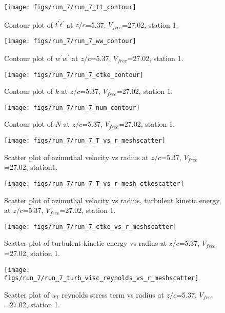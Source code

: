 \begin{figure}[H]
\centering
\texttt{[image: figs/run\_7/run\_7\_tt\_contour]}
\caption{Contour plot of $\overline{t^\prime t^\prime}$ at $z/c$=5.37, $V_{free}$=27.02, station 1.}
\end{figure}


\begin{figure}[H]
\centering
\texttt{[image: figs/run\_7/run\_7\_ww\_contour]}
\caption{Contour plot of $\overline{w^\prime w^\prime}$ at $z/c$=5.37, $V_{free}$=27.02, station 1.}
\end{figure}


\begin{figure}[H]
\centering
\texttt{[image: figs/run\_7/run\_7\_ctke\_contour]}
\caption{Contour plot of $k$ at $z/c$=5.37, $V_{free}$=27.02, station 1.}
\end{figure}


\begin{figure}[H]
\centering
\texttt{[image: figs/run\_7/run\_7\_num\_contour]}
\caption{Contour plot of $N$ at $z/c$=5.37, $V_{free}$=27.02, station 1.}
\end{figure}


\begin{figure}[H]
\centering
\texttt{[image: figs/run\_7/run\_7\_T\_vs\_r\_meshscatter]}
\caption{Scatter plot of azimuthal velocity vs radius at $z/c$=5.37, $V_{free}$=27.02, station1.}
\end{figure}


\begin{figure}[H]
\centering
\texttt{[image: figs/run\_7/run\_7\_T\_vs\_r\_mesh\_ctkescatter]}
\caption{Scatter plot of azimuthal velocity vs radius, turbulent kinetic energy, at $z/c$=5.37, $V_{free}$=27.02, station 1.}
\end{figure}


\begin{figure}[H]
\centering
\texttt{[image: figs/run\_7/run\_7\_ctke\_vs\_r\_meshscatter]}
\caption{Scatter plot of turbulent kinetic energy vs radius at $z/c$=5.37, $V_{free}$=27.02, station 1.}
\end{figure}


\begin{figure}[H]
\centering
\texttt{[image: figs/run\_7/run\_7\_turb\_visc\_reynolds\_vs\_r\_meshscatter]}
\caption{Scatter plot of $
u_T$ reynolds stress term vs radius at $z/c$=5.37, $V_{free}$=27.02, station 1.}
\end{figure}


